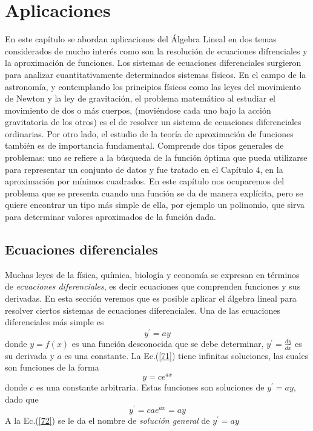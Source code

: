 \chapter{Aplicaciones}
En este capítulo se abordan aplicaciones del Álgebra Lineal  en dos temas considerados de mucho interés como son  la resolución de ecuaciones difrenciales y la aproximación de funciones. 
Los sistemas de ecuaciones diferenciales surgieron para analizar cuantitativamente determinados sistemas físicos. En el campo de la astronomía, y contemplando los  principios físicos como las leyes del movimiento de Newton y la ley de gravitación, el problema matemático  al estudiar el movimiento de dos o más cuerpos, (moviéndose cada uno bajo la acción gravitatoria de los otros) es el de resolver un sistema de ecuaciones diferenciales ordinarias. Por otro lado, el estudio de la teoría de aproximación de funciones también es de importancia fundamental. Comprende dos tipos generales de problemas: uno se refiere a la
búsqueda de la función óptima que pueda  utilizarse  para representar un
conjunto de datos y fue tratado en el Capítulo $4$, en la aproximación por mínimos cuadrados. En este capítulo nos ocuparemos del problema que se presenta cuando  una función se da de
manera explícita, pero se quiere encontrar un tipo más simple de ella, por ejemplo un polinomio, que  sirva para determinar  valores aproximados de la función dada.

\section{Ecuaciones diferenciales}
Muchas leyes de la física, química, biología y economía se expresan en términos de \textit{ecuaciones diferenciales}, es decir ecuaciones que comprenden funciones y sus derivadas. En esta sección veremos que es posible aplicar el álgebra lineal para resolver ciertos sistemas de ecuaciones diferenciales.
Una de las ecuaciones diferenciales más simple es 
\begin{equation}
  y^\prime=ay
  \label{71}
  \end{equation}
  donde $y=f(x)$ es una función desconocida que se debe determinar, $y^\prime=\frac{dy}{dx}$ es su derivada y $a$ es una constante. La Ec.(\ref{71}) tiene infinitas soluciones, las cuales son funciones de la forma
  \begin{equation}
  y=ce^{ax}
  \label{72}
  \end{equation}
  donde $c$ es una constante arbitraria. Estas funciones son soluciones de $y^\prime=ay$, dado que 
  \begin{equation}
  y^\prime=cae^{ax}=ay
  \label{73}
  \end{equation}
  A la Ec.(\ref{72}) se le da el nombre de \textit{solución general} de $y^\prime=ay$
  
